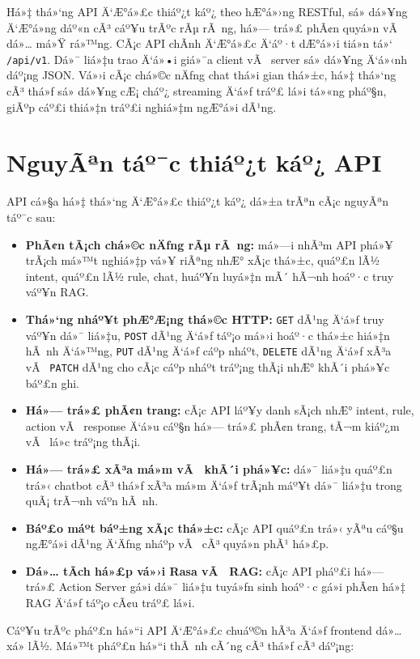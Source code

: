 ﻿\documentclass[12pt,a4paper]{report}
\begin{document}
Há»‡ thá»‘ng API Ä‘Æ°á»£c thiáº¿t káº¿ theo hÆ°á»›ng RESTful, sá»­ dá»¥ng Ä‘Æ°á»ng dáº«n cÃ³ cáº¥u trÃºc rÃµ rÃ ng, há»— trá»£ phÃ¢n quyá»n vÃ  dá»… má»Ÿ rá»™ng. CÃ¡c API chÃ­nh Ä‘Æ°á»£c Ä‘áº·t dÆ°á»›i tiá»n tá»‘ \texttt{/api/v1}. Dá»¯ liá»‡u trao Ä‘á»•i giá»¯a client vÃ  server sá»­ dá»¥ng Ä‘á»‹nh dáº¡ng JSON. Vá»›i cÃ¡c chá»©c nÄƒng chat thá»i gian thá»±c, há»‡ thá»‘ng cÃ³ thá»ƒ sá»­ dá»¥ng cÆ¡ cháº¿ streaming Ä‘á»ƒ tráº£ lá»i tá»«ng pháº§n, giÃºp cáº£i thiá»‡n tráº£i nghiá»‡m ngÆ°á»i dÃ¹ng.

\section{NguyÃªn táº¯c thiáº¿t káº¿ API}

API cá»§a há»‡ thá»‘ng Ä‘Æ°á»£c thiáº¿t káº¿ dá»±a trÃªn cÃ¡c nguyÃªn táº¯c sau:

\begin{itemize}
    \item \textbf{PhÃ¢n tÃ¡ch chá»©c nÄƒng rÃµ rÃ ng:} má»—i nhÃ³m API phá»¥ trÃ¡ch má»™t nghiá»‡p vá»¥ riÃªng nhÆ° xÃ¡c thá»±c, quáº£n lÃ½ intent, quáº£n lÃ½ rule, chat, huáº¥n luyá»‡n mÃ´ hÃ¬nh hoáº·c truy váº¥n RAG.
    \item \textbf{Thá»‘ng nháº¥t phÆ°Æ¡ng thá»©c HTTP:} \texttt{GET} dÃ¹ng Ä‘á»ƒ truy váº¥n dá»¯ liá»‡u, \texttt{POST} dÃ¹ng Ä‘á»ƒ táº¡o má»›i hoáº·c thá»±c hiá»‡n hÃ nh Ä‘á»™ng, \texttt{PUT} dÃ¹ng Ä‘á»ƒ cáº­p nháº­t, \texttt{DELETE} dÃ¹ng Ä‘á»ƒ xÃ³a vÃ  \texttt{PATCH} dÃ¹ng cho cÃ¡c cáº­p nháº­t tráº¡ng thÃ¡i nhÆ° khÃ´i phá»¥c báº£n ghi.
    \item \textbf{Há»— trá»£ phÃ¢n trang:} cÃ¡c API láº¥y danh sÃ¡ch nhÆ° intent, rule, action vÃ  response Ä‘á»u cáº§n há»— trá»£ phÃ¢n trang, tÃ¬m kiáº¿m vÃ  lá»c tráº¡ng thÃ¡i.
    \item \textbf{Há»— trá»£ xÃ³a má»m vÃ  khÃ´i phá»¥c:} dá»¯ liá»‡u quáº£n trá»‹ chatbot cÃ³ thá»ƒ xÃ³a má»m Ä‘á»ƒ trÃ¡nh máº¥t dá»¯ liá»‡u trong quÃ¡ trÃ¬nh váº­n hÃ nh.
    \item \textbf{Báº£o máº­t báº±ng xÃ¡c thá»±c:} cÃ¡c API quáº£n trá»‹ yÃªu cáº§u ngÆ°á»i dÃ¹ng Ä‘Äƒng nháº­p vÃ  cÃ³ quyá»n phÃ¹ há»£p.
    \item \textbf{Dá»… tÃ­ch há»£p vá»›i Rasa vÃ  RAG:} cÃ¡c API pháº£i há»— trá»£ Action Server gá»i dá»¯ liá»‡u tuyá»ƒn sinh hoáº·c gá»i phÃ¢n há»‡ RAG Ä‘á»ƒ táº¡o cÃ¢u tráº£ lá»i.
\end{itemize}

Cáº¥u trÃºc pháº£n há»“i API Ä‘Æ°á»£c chuáº©n hÃ³a Ä‘á»ƒ frontend dá»… xá»­ lÃ½. Má»™t pháº£n há»“i thÃ nh cÃ´ng cÃ³ thá»ƒ cÃ³ dáº¡ng:
\end{document}
